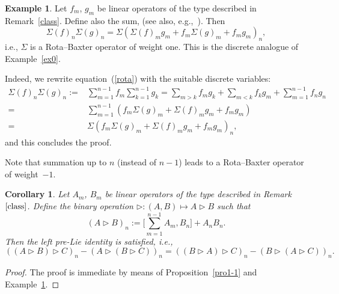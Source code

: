 \documentclass[10pt,a4paper]{amsart}
\numberwithin{equation}{section}
\newtheorem{cor}[thm]{Corollary}
\theoremstyle{definition}
\newtheorem{exam}[thm]{Example}
\begin{document}
\begin{exam} \label{ex2}
 Let $f_m$, $g_m $ be linear operators of the type described in Remark~\ref{class}. Define also the sum,  (see also, e.g.,~\cite{EbraMan}). Then{\samepage
\begin{equation}
\Sigma(f)_n\Sigma(g)_n = \Sigma(\Sigma(f)_mg_m + f_m \Sigma(g)_m +f_mg_m )_n, \label{rota}
\end{equation}
i.e., $\Sigma$ is a Rota--Baxter operator of weight one. This is the discrete analogue of Example~\ref{ex0}.}

Indeed, we rewrite equation~(\ref{rota}) with the suitable discrete variables:
\begin{align*}
\Sigma(f)_n \Sigma(g)_n:={}& \sum_{m=1}^{n-1} f_m \sum_{k=1}^{n-1} g_k = \sum_{m> k}f_m g_k +
\sum_{m< k} f_k g_m +\sum_{m=1}^{n-1} f_ng_n \\
={}&\sum_{m=1}^{n-1} (f_m \Sigma(g)_m + \Sigma(f)_m g_m +f_m g_m ) \\
={}& \Sigma(f_m \Sigma(g)_m+ \Sigma(f)_m g _m +f_mg_m )_n,
\end{align*}
and this concludes the proof.

Note that summation up to $n$ (instead of $n-1$) leads to a Rota--Baxter operator of weight~$-1$.
\end{exam}

\begin{cor} \label{corb} Let $A_m$, $B_m$ be linear operators of the type described in Remark~$\ref{class}$. Define the binary operation
$ \triangleright\colon (A, B) \mapsto A \triangleright B$ such that
\begin{equation}
(A\triangleright B)_n := \Biggl[ \sum_{m=1}^{n-1} A_m, B_n \Biggr] +A_n B_n. \label{bina2}
\end{equation}
Then the left pre-Lie identity is satisfied, i.e.,
\begin{equation*}
 ((A\triangleright B)\triangleright C )_n - (A\triangleright (B\triangleright C) )_n =
 ((B\triangleright A)\triangleright C )_n - (B\triangleright (A\triangleright C) )_n. %
\end{equation*}
\end{cor}
\begin{proof} The proof is immediate by means of Proposition~\ref{pro1-1} and Example~\ref{ex2}.
\end{proof}
\end{document}
